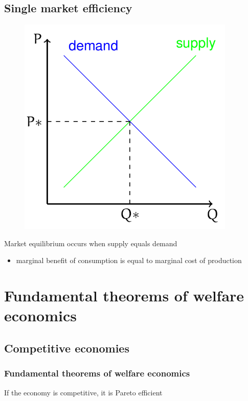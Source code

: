 \subsection{Single market efficiency}
\begin{figure}[H]
  \centering
  \includegraphics[width =0.5 \textwidth]{./img/figure10.png}
  \caption{}
\end{figure}
Market equilibrium occurs when supply equals demand
\begin{itemize}
  \item marginal benefit of consumption is equal to marginal cost of production
\end{itemize}
\section{Fundamental theorems of welfare economics}
\subsection{Competitive economies}
\subsubsection{Fundamental theorems of welfare economics}
If the economy is competitive, it is Pareto efficient
